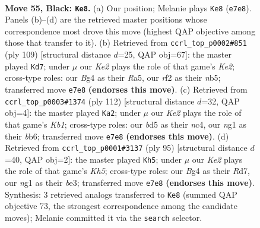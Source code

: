 \documentclass[11pt]{article}
\begin{document}
\clearpage

\begin{figure}[p]\centering
\begin{subfigure}{0.46\textwidth}\centering
\resizebox{\linewidth}{!}{%
\newchessgame
\chessboard[
  setfen={8/4k3/7r/3B4/PB4bp/1PK2p2/5R2/6N1 b - - 5 55},
  showmover=false,
  pgfstyle=straightmove, color=movearrow, markmove={e7-e8}
]}
\caption{}
\end{subfigure}\hfill
\begin{subfigure}{0.46\textwidth}\centering
\resizebox{\linewidth}{!}{%
\newchessgame
\chessboard[
  setfen={8/1p2k3/8/rN5p/2P1bP1B/pB6/K7/8 b - - 4 55},
  showmover=false,
  pgfstyle=straightmove, color=movearrow, markmove={e7-d7}
]}
\caption{}
\end{subfigure}
\\[4pt]
\begin{subfigure}{0.46\textwidth}\centering
\resizebox{\linewidth}{!}{%
\newchessgame
\chessboard[
  setfen={1k1r4/pp6/1b1PR3/8/2n5/P7/1P6/1K6 w - - 6 57},
  showmover=false,
  pgfstyle=straightmove, color=movearrow, markmove={b1-a2}
]}
\caption{}
\end{subfigure}\hfill
\begin{subfigure}{0.46\textwidth}\centering
\resizebox{\linewidth}{!}{%
\newchessgame
\chessboard[
  setfen={5R2/p2r3p/7P/5p2/7k/2b1BP2/4K3/8 b - - 3 48},
  showmover=false,
  pgfstyle=straightmove, color=movearrow, markmove={h4-h5}
]}
\caption{}
\end{subfigure}
\caption{\textbf{Move 55, Black: \texttt{Ke8}.} (a) Our position; Melanie plays \texttt{Ke8} (\texttt{e7e8}). Panels (b)--(d) are the retrieved master positions whose correspondence most drove this move (highest QAP objective among those that transfer to it). (b) Retrieved from \texttt{ccrl\_top\_p0002\#851} (ply 109) [structural distance $d$=25, QAP obj=67]: the master played \texttt{Kd7}; under $\mu$ our \emph{Ke2} plays the role of that game's \emph{Ke2}; cross-type roles: our \emph{B}g4 as their \emph{R}a5, our \emph{r}f2 as their \emph{n}b5; transferred move \texttt{e7e8} \textbf{(endorses this move)}. (c) Retrieved from \texttt{ccrl\_top\_p0003\#1374} (ply 112) [structural distance $d$=32, QAP obj=4]: the master played \texttt{Ka2}; under $\mu$ our \emph{Ke2} plays the role of that game's \emph{Kb1}; cross-type roles: our \emph{b}d5 as their \emph{n}c4, our \emph{n}g1 as their \emph{b}b6; transferred move \texttt{e7e8} \textbf{(endorses this move)}. (d) Retrieved from \texttt{ccrl\_top\_p0001\#3137} (ply 95) [structural distance $d$=40, QAP obj=2]: the master played \texttt{Kh5}; under $\mu$ our \emph{Ke2} plays the role of that game's \emph{Kh5}; cross-type roles: our \emph{B}g4 as their \emph{R}d7, our \emph{n}g1 as their \emph{b}e3; transferred move \texttt{e7e8} \textbf{(endorses this move)}. Synthesis: 3 retrieved analogs transferred to \texttt{Ke8} (summed QAP objective 73, the strongest correspondence among the candidate moves); Melanie committed it via the \texttt{search} selector.}
\label{fig:thought-m109}
\end{figure}
\end{document}
